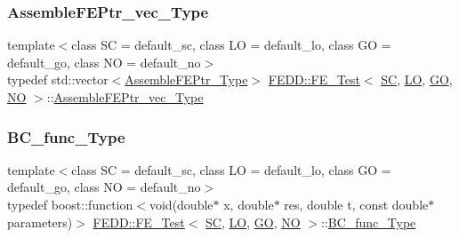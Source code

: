\mbox{\label{classFEDD_1_1FE__Test_a7c6207bb2e578ea92dbfb20aa766e2d3}} 
\subsubsection{\texorpdfstring{Assemble\+F\+E\+Ptr\+\_\+vec\+\_\+\+Type}{AssembleFEPtr\_vec\_Type}}
{\footnotesize\ttfamily template$<$class SC  = default\+\_\+sc, class LO  = default\+\_\+lo, class GO  = default\+\_\+go, class NO  = default\+\_\+no$>$ \\
typedef std\+::vector$<$\hyperlink{classFEDD_1_1FE__Test_a7a938cd88b5f936c58993fff97074e2d}{Assemble\+F\+E\+Ptr\+\_\+\+Type}$>$ \hyperlink{classFEDD_1_1FE__Test}{F\+E\+D\+D\+::\+F\+E\+\_\+\+Test}$<$ \hyperlink{fe__test__laplace_8cpp_a79c7e86a57edbb2a5a53242bcd04e41e}{SC}, \hyperlink{fe__test__laplace_8cpp_ad6a38c9f07d3fd633eefca5bccad8410}{LO}, \hyperlink{fe__test__laplace_8cpp_afa2946b509009b4f45eb04bd8c5b27d9}{GO}, \hyperlink{fe__test__laplace_8cpp_a5e24f37b28787429872b6ecb1d0417ce}{NO} $>$\+::\hyperlink{classFEDD_1_1FE__Test_a7c6207bb2e578ea92dbfb20aa766e2d3}{Assemble\+F\+E\+Ptr\+\_\+vec\+\_\+\+Type}}

\mbox{\label{classFEDD_1_1FE__Test_a1ac70a79e5935320b05ecf16739ad8a4}} 
\subsubsection{\texorpdfstring{B\+C\+\_\+func\+\_\+\+Type}{BC\_func\_Type}}
{\footnotesize\ttfamily template$<$class SC  = default\+\_\+sc, class LO  = default\+\_\+lo, class GO  = default\+\_\+go, class NO  = default\+\_\+no$>$ \\
typedef boost\+::function$<$void(double$\ast$ x, double$\ast$ res, double t, const double$\ast$ parameters)$>$ \hyperlink{classFEDD_1_1FE__Test}{F\+E\+D\+D\+::\+F\+E\+\_\+\+Test}$<$ \hyperlink{fe__test__laplace_8cpp_a79c7e86a57edbb2a5a53242bcd04e41e}{SC}, \hyperlink{fe__test__laplace_8cpp_ad6a38c9f07d3fd633eefca5bccad8410}{LO}, \hyperlink{fe__test__laplace_8cpp_afa2946b509009b4f45eb04bd8c5b27d9}{GO}, \hyperlink{fe__test__laplace_8cpp_a5e24f37b28787429872b6ecb1d0417ce}{NO} $>$\+::\hyperlink{classFEDD_1_1FE__Test_a1ac70a79e5935320b05ecf16739ad8a4}{B\+C\+\_\+func\+\_\+\+Type}}

